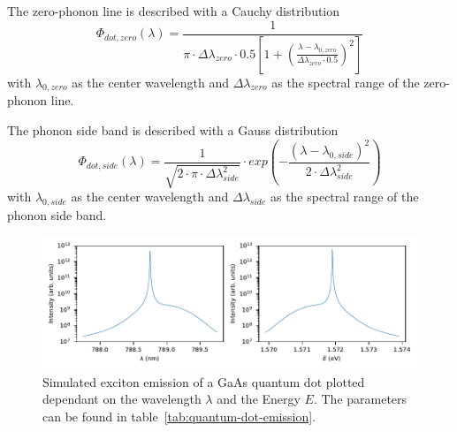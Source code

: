 The zero-phonon line is described with a Cauchy distribution
\begin{equation}
\Phi_{dot,zero}(\lambda) = \frac{1}{\pi \cdot \Delta\lambda_{zero} \cdot 0.5 \left[1+\left(\frac{\lambda - \lambda_{0, zero}}{\Delta\lambda_{zero} \cdot 0.5}\right)^2\right]}
\end{equation}
with $\lambda_{0, zero}$ as the center wavelength and $\Delta\lambda_{zero}$ as the spectral range of the zero-phonon line.

The phonon side band is described with a Gauss distribution
\begin{equation}
\Phi_{dot,side}(\lambda) = \frac{1}{\sqrt{2\cdot\pi\cdot \Delta\lambda_{side}^2}}\cdot exp\left(-\frac{(\lambda - \lambda_{0, side})^2}{2\cdot \Delta\lambda_{side}^2}\right)
\end{equation}
with $\lambda_{0, side}$ as the center wavelength and $\Delta\lambda_{side}$ as the spectral range of the phonon side band.

\begin{figure}[H]
	\centering
	\includegraphics{figures/fabry-perot/plots/quantum_dot_emission_wavelength_energy}
	\caption[Simulated exciton emission of a GaAs quantum dot]{Simulated exciton emission of a GaAs quantum dot plotted dependant on the wavelength $\lambda$ and the Energy $E$.
		The parameters can be found in table~\ref{tab:quantum-dot-emission}.}
	\label{fig:quantumdotemissionwavelengthenergy}
\end{figure}



